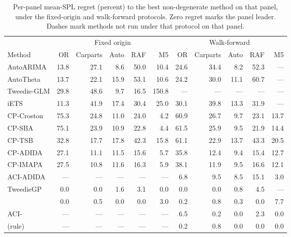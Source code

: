 \begin{table}[t]
\centering
\caption{Per-panel mean-SPL regret (percent) to the best non-degenerate
method on that panel, under the fixed-origin and walk-forward protocols.
Zero regret marks the panel leader. Dashes mark methods not run under
that protocol on that panel.}
\label{tab:regret-full}
\small
\setlength{\tabcolsep}{4.2pt}
\begin{tabular}{lrrrrrrrrrr}
\toprule
 & \multicolumn{5}{c}{Fixed origin} & \multicolumn{5}{c}{Walk-forward}\\
\cmidrule(lr){2-6}\cmidrule(lr){7-11}
Method & OR & Carparts & Auto & RAF & M5 & OR & Carparts & Auto & RAF & M5\\
\midrule
AutoARIMA & 13.8 & 27.1 & 8.6 & 50.0 & 10.4 & 24.6 & 34.4 & 8.2 & 52.3 & ---\\
AutoTheta & 13.7 & 22.1 & 15.9 & 53.1 & 10.6 & 24.2 & 30.0 & 11.1 & 60.7 & ---\\
Tweedie-GLM & 29.8 & 48.6 & 9.7 & 16.5 & 150.8 & --- & --- & --- & --- & ---\\
iETS & 11.3 & 41.9 & 17.4 & 30.4 & 25.0 & 30.1 & 39.8 & 13.3 & 31.9 & ---\\
CP-Croston & 75.3 & 24.8 & 11.0 & 24.0 & 4.2 & 60.9 & 26.7 & 9.7 & 23.1 & 13.7\\
CP-SBA & 75.1 & 23.9 & 10.9 & 22.8 & 4.4 & 61.5 & 25.9 & 9.5 & 21.9 & 14.4\\
CP-TSB & 32.8 & 17.7 & 17.8 & 42.3 & 15.8 & 61.1 & 22.9 & 13.7 & 43.3 & 20.5\\
CP-ADIDA & 27.1 & 11.1 & 11.5 & 15.6 & 5.7 & 35.8 & 12.4 & 9.4 & 15.4 & 12.7\\
CP-IMAPA & 27.5 & 10.8 & 11.6 & 16.3 & 5.9 & 38.1 & 11.9 & 9.5 & 16.6 & 12.1\\
ACI-ADIDA & --- & --- & --- & --- & --- & 6.8 & 9.5 & 8.5 & 15.1 & 3.0\\
TweedieGP & 0.0 & 0.0 & 1.6 & 3.1 & 0.0 & 0.0 & 0.0 & 0.8 & 4.5 & ---\\
\midrule
\EBB{} & 0.0 & 0.5 & 0.0 & 0.0 & 3.0 & 0.2 & 0.8 & 0.3 & 0.0 & 7.7\\
ACI-\EBB{} & --- & --- & --- & --- & --- & 6.5 & 0.2 & 0.0 & 2.3 & 0.0\\
\EBB{} (rule) & --- & --- & --- & --- & --- & 0.2 & 0.8 & 0.0 & 0.0 & 0.0\\
\bottomrule
\end{tabular}
\end{table}

